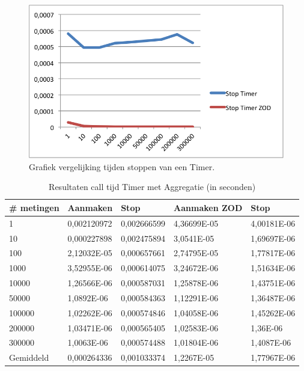 \begin{figure}[!h]
  \centering
  \includegraphics[scale=1.0]{Afbeeldingen/Evaluatie/StopTimer}
  \caption{Grafiek vergelijking tijden stoppen van een Timer.}
  \label{fig:GraphTimerStop}
\end{figure}


\begin{table}[]
\centering
\begin{tabular}{|l|l|l|l|l|}
\hline
\# metingen & Aanmaken    & Stop        & Aanmaken ZOD & Stop        \\ \hline
1           & 0,002120972 & 0,002666599 & 4,36699E-05  & 4,00181E-06 \\ \hline
10          & 0,000227898 & 0,002475894 & 3,0541E-05   & 1,69697E-06 \\ \hline
100         & 2,12032E-05 & 0,000657661 & 2,74795E-05  & 1,77817E-06 \\ \hline
1000        & 3,52955E-06 & 0,000614075 & 3,24672E-06  & 1,51634E-06 \\ \hline
10000       & 1,26566E-06 & 0,000587031 & 1,25878E-06  & 1,43751E-06 \\ \hline
50000       & 1,0892E-06  & 0,000584363 & 1,12291E-06  & 1,36487E-06 \\ \hline
100000      & 1,02262E-06 & 0,000574846 & 1,04058E-06  & 1,45262E-06 \\ \hline
200000      & 1,03471E-06 & 0,000565405 & 1,02583E-06  & 1,36E-06    \\ \hline
300000      & 1,0063E-06  & 0,000574488 & 1,01804E-06  & 1,4087E-06  \\ \hline
Gemiddeld   & 0,000264336 & 0,001033374 & 1,2267E-05   & 1,77967E-06 \\ \hline
\end{tabular}
\caption{Resultaten call tijd Timer met Aggregatie (in seconden)}
\label{Table:TimerAggregate}
\end{table}

